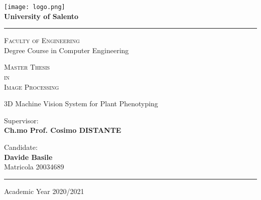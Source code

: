 

\linespread{1.5}

\begin{titlepage}
 
\begin{center}
 
\texttt{[image: logo.png]}
\\
\vspace{.3cm}
\textbf{\Large University of Salento}
\vspace{.2cm}
\hrule

\begin{center}
	\doublespacing
	\textsc{\Large Faculty of Engineering} \\

	\textmd{\Large Degree Course in Computer Engineering}
	
	\vspace{1cm} 
	\textsc{\Large Master Thesis} \\
	\textsc{\Large in} \\
	\textsc{\Large Image Processing}	
	\vspace{2.3cm}
	
	\Huge \doublespacing \bfseries \begin{spacing}{1}{3D Machine Vision System for Plant Phenotyping}\end{spacing}
\end{center}
 
\hfill
\vspace{2.5cm}

\begin{flushleft}
	\begin{minipage}[c]{.55\textwidth}
		\singlespacing
		\fontsize{12}{12} \textmd{Supervisor:} \\
		\fontsize{14.4}{12} \textbf{Ch.mo Prof. Cosimo DISTANTE} \\
	\end{minipage}%
	\hspace{10mm}%
	\begin{minipage}[c]{.35\textwidth}
		\bigskip
		\bigskip
		\singlespacing
		\fontsize{12}{12} \textmd{Candidate:} \\
		\fontsize{14.4}{12} \textbf{Davide Basile} \\
		\fontsize{12}{12} \textmd{Matricola 20034689} \\
	\end{minipage}
\end{flushleft}

\vfill
\hfill

\vspace{.25cm}
\hrule
\vspace{.25cm}
{\small Academic Year 2020/2021} 
\end{center}
\clearpage
\end{titlepage}

\restoregeometry
